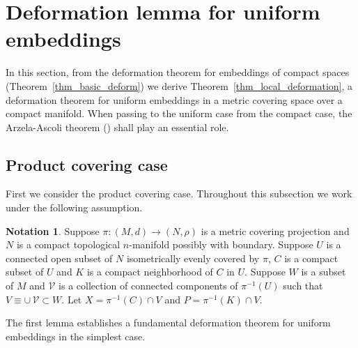 \documentclass[11pt, fleqn]{amsart}
\theoremstyle{definition}
\newtheorem{notation}{Notation}[section]
\newcommand{\cal}{\mathcal}
\newcommand{\e}{\varepsilon}
\begin{document}
\section{Deformation lemma for uniform embeddings} 

In this section, from the deformation theorem for embeddings of compact spaces (Theorem~\ref{thm_basic_deform}) 
we derive Theorem~\ref{thm_local_deformation}, a deformation theorem for uniform embeddings in a metric covering space over a compact manifold. When passing to the uniform case from the compact case, 
the Arzela-Ascoli theorem (\cite[Theorem 6.4]{Du}) shall play an essential role. 

\subsection{Product covering case} \mbox{}  

First we consider the product covering case.  
Throughout this subsection we work under the following assumption. 

\begin{notation}\label{notation-1} 
Suppose $\pi : (M, d) \to (N, \rho)$ is a metric covering projection and $N$ is a compact topological $n$-manifold possibly with boundary. Suppose $U$ is a connected open subset of $N$ isometrically evenly covered by $\pi$, 
$C$ is a compact subset of $U$ and 
$K$ is a compact neighborhood of $C$ in $U$. 
Suppose $W$ is a subset of $M$ and 
${\cal V}$ is a collection of connected components of $\pi^{-1}(U)$  such that $V \equiv \cup\,{\cal V} \subset W$. 
Let $X = \pi^{-1}(C) \cap V$ and $P = \pi^{-1}(K) \cap V$. 
\end{notation}

The first lemma establishes a fundamental deformation theorem for uniform embeddings in the simplest case. 
\end{document}
